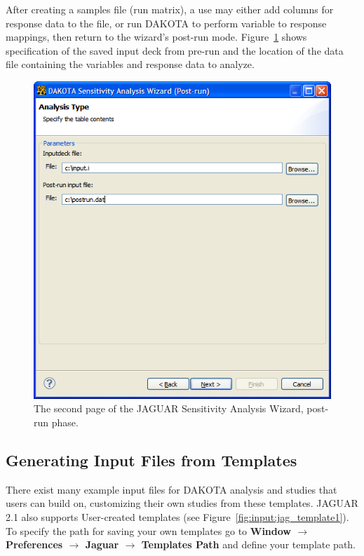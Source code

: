 After creating a samples file (run matrix), a use may either add
columns for response data to the file, or run DAKOTA to perform
variable to response mappings, then return to the wizard's post-run
mode.  Figure~\ref{fig:input:jaguar_sa_post_run} shows specification
of the saved input deck from pre-run and the location of the data file
containing the variables and response data to analyze.
\begin{figure}
  \centering
  \includegraphics[scale=0.5]{images/jaguar_sa_post_run}
  \caption{The second page of the JAGUAR Sensitivity Analysis Wizard,
  post-run phase.}
  \label{fig:input:jaguar_sa_post_run}
\end{figure}

\subsection{Generating Input Files from Templates}

There exist many example input files for DAKOTA analysis and studies
that users can build on, customizing their own studies from these
templates. JAGUAR 2.1 also supports User-created templates 
(see Figure~\ref{fig:input:jag_template1}). To specify the path for 
saving your own templates go to 
{\bf Window $\rightarrow$ Preferences $\rightarrow$ Jaguar $\rightarrow$ Templates Path} 
and define your template path.


